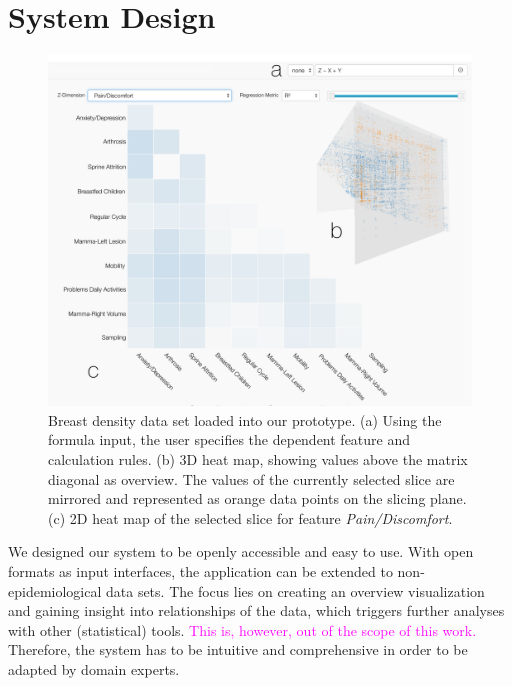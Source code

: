 \documentclass[journal]{style/vgtc} 			          %
\newcommand{\magenta}[1]{\textcolor{magenta}{#1}}
\begin{document}
\section{System Design} \label{sec:SystemDesign}
\begin{figure}[htb]
 \centering
 \includegraphics[width=1.0\linewidth]{figures/system}
 \caption{
 Breast density data set loaded into our prototype.
 (a) Using the formula input, the user specifies the dependent feature and calculation rules.
 (b) 3D heat map, showing values above the matrix diagonal as overview.
 The values of the currently selected slice are mirrored and represented as orange data points on the slicing plane.
 (c) 2D heat map of the selected slice for feature \emph{Pain/Discomfort}.
 }
  \label{fig:System}
\end{figure}
\noindent We designed our system to be openly accessible and easy to use.
With open formats as input interfaces, the application can be extended to non-epidemiological data sets.
The focus lies on creating an overview visualization and gaining insight into relationships of the data, which triggers further analyses with other (statistical) tools.
\magenta{This is, however, out of the scope of this work.}
Therefore, the system has to be intuitive and comprehensive in order to be adapted by domain experts.
\end{document}
